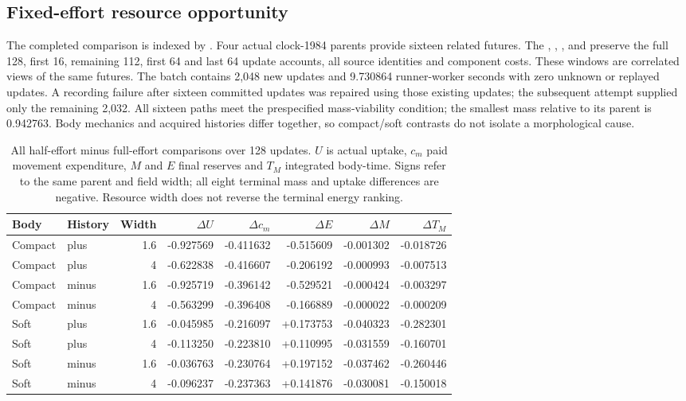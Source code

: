 \subsection*{Fixed-effort resource opportunity}
The completed comparison is indexed by . Four actual clock-1984 parents provide sixteen related futures. The , , ,  and  preserve the full 128, first 16, remaining 112, first 64 and last 64 update accounts, all source identities and component costs. These windows are correlated views of the same futures. The batch contains 2,048 new updates and 9.730864 runner-worker seconds with zero unknown or replayed updates. A recording failure after sixteen committed updates was repaired using those existing updates; the subsequent attempt supplied only the remaining 2,032. All sixteen paths meet the prespecified mass-viability condition; the smallest mass relative to its parent is 0.942763. Body mechanics and acquired histories differ together, so compact/soft contrasts do not isolate a morphological cause.

\begin{table}[htbp]\centering\scriptsize
\caption{All half-effort minus full-effort comparisons over 128 updates. $U$ is actual uptake, $c_m$ paid movement expenditure, $M$ and $E$ final reserves and $T_M$ integrated body-time. Signs refer to the same parent and field width; all eight terminal mass and uptake differences are negative. Resource width does not reverse the terminal energy ranking.}\label{tab:effort-comparisons}
\begin{tabular}{llrrrrrr}\toprule
Body & History & Width & $\Delta U$ & $\Delta c_m$ & $\Delta E$ & $\Delta M$ & $\Delta T_M$\\\midrule
Compact & plus & 1.6 & -0.927569 & -0.411632 & -0.515609 & -0.001302 & -0.018726 \\
Compact & plus & 4 & -0.622838 & -0.416607 & -0.206192 & -0.000993 & -0.007513 \\
Compact & minus & 1.6 & -0.925719 & -0.396142 & -0.529521 & -0.000424 & -0.003297 \\
Compact & minus & 4 & -0.563299 & -0.396408 & -0.166889 & -0.000022 & -0.000209 \\
Soft & plus & 1.6 & -0.045985 & -0.216097 & +0.173753 & -0.040323 & -0.282301 \\
Soft & plus & 4 & -0.113250 & -0.223810 & +0.110995 & -0.031559 & -0.160701 \\
Soft & minus & 1.6 & -0.036763 & -0.230764 & +0.197152 & -0.037462 & -0.260446 \\
Soft & minus & 4 & -0.096237 & -0.237363 & +0.141876 & -0.030081 & -0.150018 \\
\bottomrule\end{tabular}\end{table}

